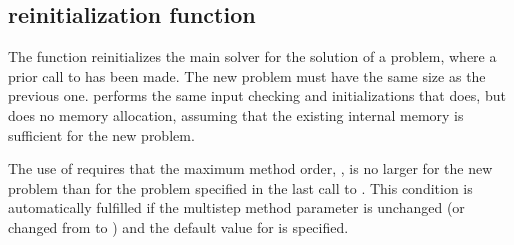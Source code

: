 \subsection{{\cvode} reinitialization function}\label{sss:cvreinit}

The function  reinitializes the main {\cvode} solver for
the solution of a problem, where a prior call to  has
been made. The new problem must have the same size as the previous one.
 performs the same input checking and initializations 
that  does, but does no memory allocation, assuming that the 
existing internal memory is sufficient for the new problem.             
                                                                 
The use of  requires that the maximum method order,    
, is no larger for the new problem than for the problem  
specified in the last call to .  This condition is  
automatically fulfilled if the multistep method parameter   
is unchanged (or changed from  to ) and the default    
value for  is specified.


